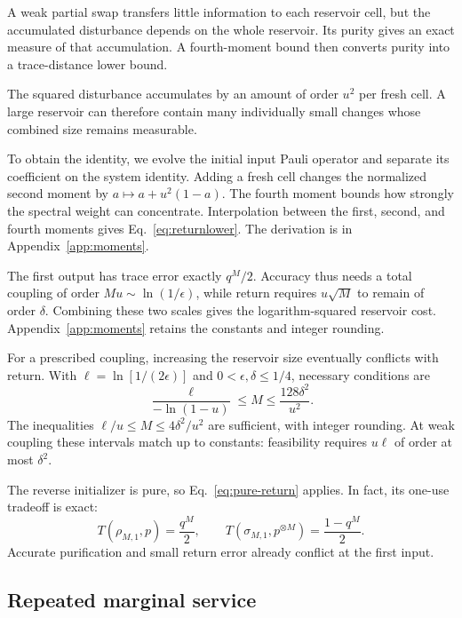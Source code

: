 \documentclass[aps,pra,reprint,superscriptaddress,longbibliography,nofootinbib,floatfix]{revtex4-2}
\begin{document}
A weak partial swap transfers little information to each reservoir cell, but the accumulated disturbance depends on the whole reservoir. Its purity gives an exact measure of that accumulation. A fourth-moment bound then converts purity into a trace-distance lower bound.


The squared disturbance accumulates by an amount of order $u^2$ per fresh cell. A large reservoir can therefore contain many individually small changes whose combined size remains measurable.

To obtain the identity, we evolve the initial input Pauli operator and separate its coefficient on the system identity. Adding a fresh cell changes the normalized second moment by $a\mapsto a+u^2(1-a)$. The fourth moment bounds how strongly the spectral weight can concentrate. Interpolation between the first, second, and fourth moments gives Eq.~\eqref{eq:returnlower}. The derivation is in Appendix~\ref{app:moments}.


The first output has trace error exactly $q^M/2$. Accuracy thus needs a total coupling of order $Mu\sim\ln(1/\epsilon)$, while return requires $u\sqrt M$ to remain of order $\delta$. Combining these two scales gives the logarithm-squared reservoir cost. Appendix~\ref{app:moments} retains the constants and integer rounding.

For a prescribed coupling, increasing the reservoir size eventually conflicts with return. With $\ell=\ln[1/(2\epsilon)]$ and $0<\epsilon,\delta\le1/4$, necessary conditions are
\begin{equation}
 \frac{\ell}{-\ln(1-u)}\le M\le\frac{128\delta^2}{u^2}.
 \label{eq:prescribed1necess}
\end{equation}
The inequalities $\ell/u\le M\le4\delta^2/u^2$ are sufficient, with integer rounding. At weak coupling these intervals match up to constants: feasibility requires $u\ell$ of order at most $\delta^2$.

The reverse initializer is pure, so Eq.~\eqref{eq:pure-return} applies. In fact, its one-use tradeoff is exact:
\begin{equation}
 T(\rho_{M,1},p)=\frac{q^M}{2},\qquad
 T(\sigma_{M,1},p^{\otimes M})=\frac{1-q^M}{2}.
 \label{eq:reverse-first}
\end{equation}
Accurate purification and small return error already conflict at the first input.

\subsection{Repeated marginal service}
\end{document}
